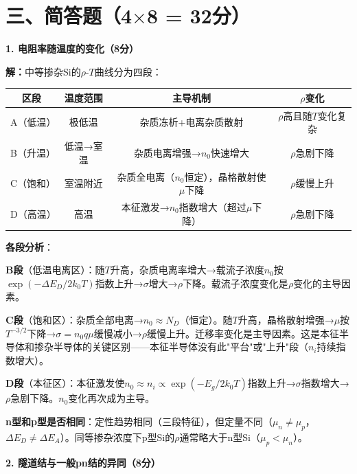 \documentclass[12pt,a4paper]{ctexart}
\begin{document}
\newpage

\section*{三、简答题（4$\times$8 = 32分）}

\noindent\textbf{1. 电阻率随温度的变化（8分）}

\textbf{解：}\quad 中等掺杂Si的$\rho$-$T$曲线分为四段：

\begin{center}
\begin{tabular}{c|c|c|c}
\toprule
\textbf{区段} & \textbf{温度范围} & \textbf{主导机制} & \textbf{$\rho$变化} \\
\midrule
A（低温） & 极低温 & 杂质冻析+电离杂质散射 & $\rho$高且随$T$变化复杂 \\
B（升温） & 低温→室温 & 杂质电离增强→$n_0$快速增大 & $\rho$急剧下降 \\
C（饱和） & 室温附近 & 杂质全电离（$n_0$恒定），晶格散射使$\mu$下降 & $\rho$缓慢上升 \\
D（高温） & 高温 & 本征激发→$n_0$指数增大（超过$\mu$下降） & $\rho$急剧下降 \\
\bottomrule
\end{tabular}
\end{center}

\textbf{各段分析}：

\textbf{B段}（低温电离区）：随$T$升高，杂质电离率增大→载流子浓度$n_0$按$\exp(-\Delta E_D/2k_0T)$指数上升→$\sigma$增大→$\rho$下降。载流子浓度变化是$\rho$变化的主导因素。

\textbf{C段}（饱和区）：杂质全部电离→$n_0 \approx N_D$（恒定）。随$T$升高，晶格散射增强→$\mu$按$T^{-3/2}$下降→$\sigma = n_0 q\mu$缓慢减小→$\rho$缓慢上升。迁移率变化是主导因素。这是本征半导体和掺杂半导体的关键区别——本征半导体没有此"平台"或"上升"段（$n_i$持续指数增大）。

\textbf{D段}（本征区）：本征激发使$n_0 \approx n_i \propto \exp(-E_g/2k_0T)$指数上升→$\sigma$指数增大→$\rho$急剧下降。$n_0$变化再次成为主导。

\textbf{n型和p型是否相同}：定性趋势相同（三段特征），但定量不同（$\mu_n \neq \mu_p$，$\Delta E_D \neq \Delta E_A$）。同等掺杂浓度下p型Si的$\rho$通常略大于n型Si（$\mu_p < \mu_n$）。

\vspace{1cm}

\noindent\textbf{2. 隧道结与一般pn结的异同（8分）}
\end{document}
